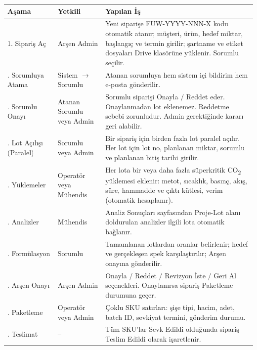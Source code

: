 \documentclass[11pt,a4paper]{article}
\begin{document}
\begin{tabularx}{\textwidth}{p{3.4cm}p{3cm}X}
\toprule
\textbf{Aşama} & \textbf{Yetkili} & \textbf{Yapılan İş} \\
\midrule
1. Sipariş Aç & Arşen Admin & Yeni siparişe FUW-YYYY-NNN-X kodu otomatik atanır; müşteri, ürün, hedef miktar, başlangıç ve termin girilir; şartname ve etiket dosyaları Drive klasörüne yüklenir. Sorumlu seçilir. \\
\addlinespace
2. Sorumluya Atama & Sistem $\rightarrow$ Sorumlu & Atanan sorumluya hem sistem içi bildirim hem e-posta gönderilir. \\
\addlinespace
3. Sorumlu Onayı & Atanan Sorumlu veya Admin & Sorumlu siparişi Onayla / Reddet eder. Onaylanmadan lot eklenemez. Reddetme sebebi zorunludur. Admin gerektiğinde kararı geri alabilir. \\
\addlinespace
4. Lot Açılışı (Paralel) & Sorumlu veya Admin & Bir sipariş için birden fazla lot paralel açılır. Her lot için lot no, planlanan miktar, sorumlu ve planlanan bitiş tarihi girilir. \\
\addlinespace
5. Yüklemeler & Operatör veya Mühendis & Her lota bir veya daha fazla süperkritik CO\textsubscript{2} yüklemesi eklenir: metot, sıcaklık, basınç, akış, süre, hammadde ve çıktı kütlesi, verim (otomatik hesaplanır). \\
\addlinespace
6. Analizler & Mühendis & Analiz Sonuçları sayfasından Proje-Lot alanı doldurulan analizler ilgili lota otomatik bağlanır. \\
\addlinespace
7. Formülasyon & Sorumlu & Tamamlanan lotlardan oranlar belirlenir; hedef ve gerçekleşen spek karşılaştırılır; Arşen onayına gönderilir. \\
\addlinespace
8. Arşen Onayı & Arşen Admin & Onayla / Reddet / Revizyon İste / Geri Al seçenekleri. Onaylanırsa sipariş Paketleme durumuna geçer. \\
\addlinespace
9. Paketleme & Operatör veya Admin & Çoklu SKU satırları: şişe tipi, hacim, adet, batch ID, sevkiyat termini, gönderim durumu. \\
\addlinespace
10. Teslimat & -- & Tüm SKU'lar Sevk Edildi olduğunda sipariş Teslim Edildi olarak işaretlenir. \\
\bottomrule
\end{tabularx}

\newpage

\end{document}
